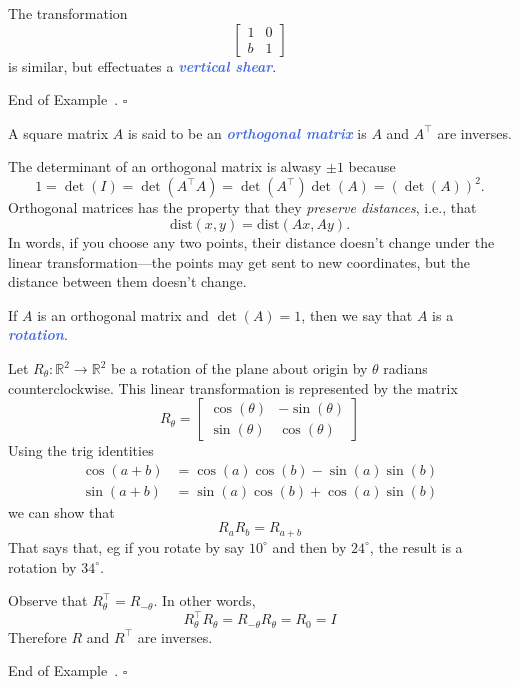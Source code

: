 \documentclass[10pt]{article}
\newcommand{\demph}[1]{\textcolor{RoyalBlue}{\textbf{\slshape #1}}} %
\theoremstyle{definition}
\newtheorem{example}[theorem]{Example}
\renewenvironment{example}
{\begin{oldexample}}
  {\par\smallskip\hfill   End of Example~\theexample. $\square$    \par\end{oldexample}}
\newcommand{\R}{\mathbb{R}}           %
\newcommand{\dist}{\mathrm{dist}} %
\begin{document}
\begin{example}[Shear]
  The transformation
  \begin{equation*}
    \begin{bmatrix}
      1&0\\
      b&1
    \end{bmatrix}
  \end{equation*}
  is similar, but effectuates a \demph{vertical shear}.
\end{example}


A square matrix $A$ is said to be an \demph{orthogonal matrix} is $A$ and $A^{\top}$ are
inverses.

The determinant of an orthogonal matrix is alwasy $\pm 1$ because
\begin{equation*}
  1 = \det(I)=\det (A^{\top}A) = \det(A^{\top})\det(A) =\left(\det(A)\right)^{2}.
\end{equation*}
Orthogonal matrices has the property that they \textit{preserve distances},
i.e., that
\begin{equation*}
  \dist(x,y) = \dist(Ax,Ay).
\end{equation*}
In words, if you choose any two points, their distance doesn't change under
the linear transformation---the points may get sent to new coordinates, but
the distance between them doesn't change.

If $A$ is an orthogonal matrix and $\det(A)=1$, then we say that $A$ is a
\demph{rotation}.



\begin{example}[Rotation]
  Let $R_{\theta}:\R^{2}\to \R^{2}$ be a rotation of the plane about origin by
  $\theta$ radians counterclockwise. This linear transformation is represented
  by the matrix
  \begin{equation*}
    R_{\theta}=
    \begin{bmatrix}
      \cos(\theta)& -\sin(\theta)\\
      \sin(\theta)& \cos(\theta)
    \end{bmatrix}    
  \end{equation*}
  Using the trig identities
  \begin{align*}
    \cos(a+b) 
    &= \cos(a)\cos(b) - \sin(a)\sin(b)\\
    \sin(a+b)
    &= \sin(a)\cos(b) + \cos(a)\sin(b)
  \end{align*}
  we can show that
  \begin{equation*}
    R_{a}R_{b}=R_{a+b}
  \end{equation*}
  That says that, eg if you rotate by say $10^{\circ}$ and then by
  $24^{\circ}$, the result is a rotation by $34^{\circ}$.

  Observe that $R_{\theta}^{\top}= R_{-\theta}$. In other words,
  \begin{equation*}
    R_{\theta}^{\top}R_{\theta} = R_{-\theta}R_{\theta}=R_{0}=I
  \end{equation*}
  Therefore $R$ and $R^{\top}$ are inverses.
\end{example}
\end{document}
